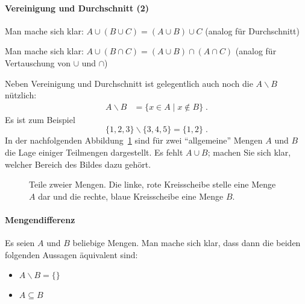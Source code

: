 %
\begin{tutorium}
  \paragraph{Vereinigung und Durchschnitt (2)}

  Man mache sich klar: $A\cup(B \cup C)=(A\cup B)\cup C$
  (analog für Durchschnitt)

  Man mache sich klar: $A\cup(B \cap C)=(A\cup B)\cap (A\cap C)$
  (analog für Vertauschung von $\cup$ und $\cap$)
\end{tutorium}
%
Neben Vereinigung und Durchschnitt ist gelegentlich auch noch die
 $A\smallsetminus B$ nützlich:
\begin{align*}
  A \smallsetminus B &= \{ x\in A \mid x \notin B \} \;.
\end{align*}
%
Es ist zum Beispiel
\[
  \{ 1,2,3\} \smallsetminus \{3,4,5\} = \{1,2\} \;.
\]
%
In der nachfolgenden Abbildung~\ref{fig:zwei-mengen} sind für zwei
"`allgemeine"' Mengen $A$ und $B$ die Lage einiger Teilmengen
dargestellt.
%
Es fehlt $A\cup B$; machen Sie sich klar, welcher Bereich des Bildes
dazu gehört.
%
\begin{figure}[ht]
  \centering
  \caption{Teile zweier Mengen. Die linke, rote Kreisscheibe stelle
    eine Menge $A$ dar und die rechte, blaue Kreisscheibe eine Menge
    $B$.}
  \label{fig:zwei-mengen}
\end{figure}
%
\begin{tutorium}
  \paragraph{Mengendifferenz}

  Es seien $A$ und $B$ beliebige Mengen.
  Man mache sich klar, dass dann die beiden folgenden Aussagen
  äquivalent sind:
  \begin{itemize}
  \item $A\smallsetminus B =\{\}$
  \item $A\subseteq B$
  \end{itemize}
\end{tutorium}


